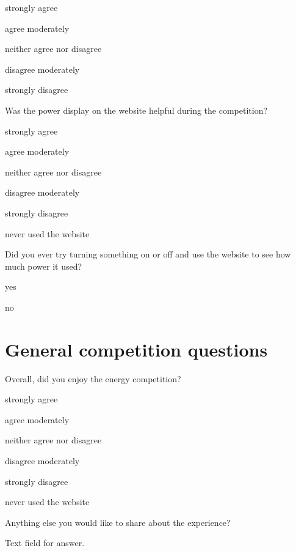 \begin{answer}
	\item strongly agree
	\item agree moderately
	\item neither agree nor disagree
	\item disagree moderately
	\item strongly disagree
\end{answer}

\begin{question}
	\item Was the power display on the website helpful during the competition?
\end{question}

\begin{answer}
	\item strongly agree
	\item agree moderately
	\item neither agree nor disagree
	\item disagree moderately
	\item strongly disagree
	\item never used the website
\end{answer}

\begin{question}
	\item Did you ever try turning something on or off and use the website to see how much power it used?
\end{question}

\begin{answer}
	\item yes
	\item no
\end{answer}


\section{General competition questions}

\begin{question}
	\item Overall, did you enjoy the energy competition?
\end{question}

\begin{answer}
	\item strongly agree
	\item agree moderately
	\item neither agree nor disagree
	\item disagree moderately
	\item strongly disagree
	\item never used the website
\end{answer}

\begin{question}
	\item Anything else you would like to share about the experience?
\end{question}

Text field for answer.
